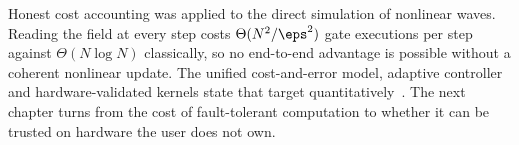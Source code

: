 Honest cost accounting was applied to the direct simulation of nonlinear waves. Reading the field at every step costs $\Theta(N^{2}/\eps^{2})$ gate executions per step against $\Theta(N\log N)$ classically, so no end-to-end advantage is possible without a coherent nonlinear update. The unified cost-and-error model, adaptive controller and hardware-validated kernels state that target quantitatively~\cite{guo2026nonlinearwaves}. The next chapter turns from the cost of fault-tolerant computation to whether it can be trusted on hardware the user does not own.

